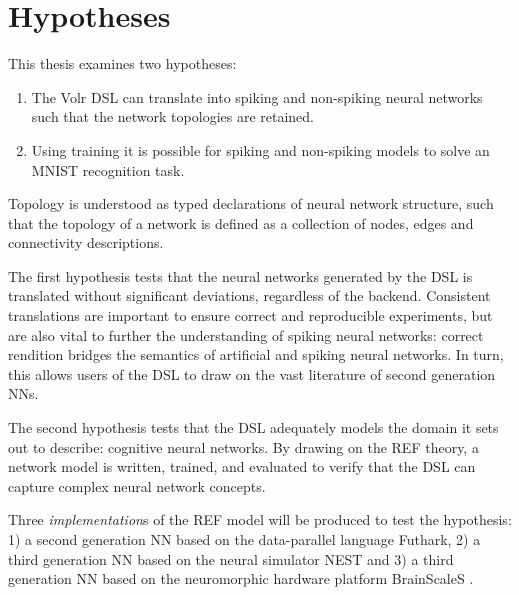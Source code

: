 \section{Hypotheses} \label{sec:hypotheses}
This thesis examines two hypotheses:

\begin{enumerate}
  \item The Volr DSL can translate into spiking and non-spiking neural networks such that the network topologies are retained.
  \item Using training it is possible for spiking and non-spiking models to solve an MNIST recognition task.
\end{enumerate}

Topology is understood as typed declarations of neural network structure, such
that the topology of a network is defined as a collection of nodes, edges and connectivity descriptions.

The first hypothesis tests that the neural networks generated by the DSL is translated without significant
deviations, regardless of the backend.
Consistent translations are important to ensure correct and reproducible experiments,
but are also vital to further the understanding of spiking neural networks:
correct rendition bridges the semantics of artificial and spiking neural networks.
In turn, this allows users of the DSL to draw on the vast literature of
second generation \gls{NN}s.

The second hypothesis tests that the DSL adequately models the domain it sets
out to describe: cognitive neural networks.
By drawing on the REF theory, a network model is written, trained, and evaluated to verify
that the DSL can capture complex neural network concepts.

Three \textit{implementation}s of the \gls{REF} model will be
produced to test the hypothesis: 
  1) a second generation \gls{NN} based on the data-parallel language Futhark, 
  2) a third generation \gls{NN} based on the neural simulator NEST and
  3) a third generation \gls{NN} based on the neuromorphic 
     hardware platform BrainScaleS .

